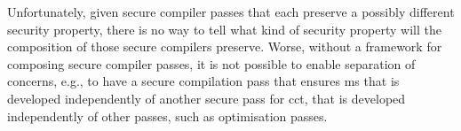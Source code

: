 \documentclass[dvipsnames,conference]{IEEEtran}
\theoremstyle{definition}
\begin{document}

Unfortunately, given secure compiler passes that each preserve a possibly different security property, there is no way to tell what kind of security property will the composition of those secure compilers preserve.
Worse, without a framework for composing secure compiler passes, it is not possible to enable separation of concerns, e.g., to have a secure compilation pass that ensures \gls*{ms} that is developed independently of another secure pass for \gls*{cct}, that is developed independently of other passes, such as optimisation passes.
\end{document}
